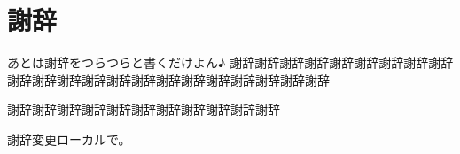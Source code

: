 \chapter*{謝辞}

あとは謝辞をつらつらと書くだけよん♪
謝辞謝辞謝辞謝辞謝辞謝辞謝辞謝辞謝辞謝辞謝辞謝辞謝辞謝辞謝辞謝辞謝辞謝辞謝辞謝辞謝辞謝辞


謝辞謝辞謝辞謝辞謝辞謝辞謝辞謝辞謝辞謝辞謝辞



謝辞変更ローカルで。